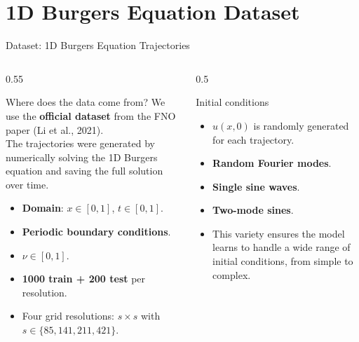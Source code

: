 \section{1D Burgers Equation Dataset}

\begin{frame}{\Large Dataset: 1D Burgers Equation Trajectories}
\vspace{-0.5em}
  \begin{columns}[t]
    \begin{column}{0.55\textwidth}
      \begin{block}{\centering \small Where does the data come from?}
        We use the \textbf{official dataset} from the FNO paper
        (Li et al., 2021).\\ The trajectories were generated by
        numerically solving the 1D Burgers equation and saving
        the full solution over time.
        \begin{itemize}\setlength\itemsep{1pt}
          \item \small \textbf{Domain}: $x \in [0,1]$, $t \in [0,1]$.
          \vspace{0.2em}
          \item \textbf{Periodic boundary conditions}.
          \vspace{0.2em}
          \item \small $\nu \in [0,1]$.
          \vspace{0.2em}
          \item \textbf{1000 train + 200 test} per resolution.
          \vspace{0.05em}
          \item Four grid resolutions: $s \times s$ with $s \in \{85, 141, 211, 421\}$.
        \end{itemize}
      \end{block}
    \end{column}
    \begin{column}{0.5\textwidth}
      \begin{block}{\centering \small Initial conditions}
        \begin{itemize}
            \item \small $u(x,0)$ is randomly generated for each trajectory.
              \item \small \textbf{Random Fourier modes}.
              \item \small \textbf{Single sine waves}.
              \item \small \textbf{Two-mode sines}.
            \item This variety ensures the model learns to handle a wide range of initial conditions, from simple to complex.
        \end{itemize}
        \end{block}
    \end{column}
  \end{columns}

\end{frame}

